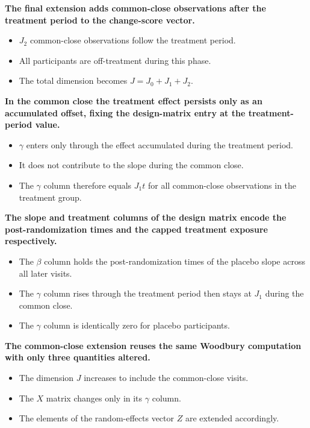 \documentclass[
  11pt,
]{article}
\begin{document}
\textbf{The final extension adds common-close observations after the treatment period to the change-score vector.}

\begin{itemize}\setlength{\itemsep}{2pt}\setlength{\parskip}{0pt}
\item $J_2$ common-close observations follow the treatment period.
\item All participants are off-treatment during this phase.
\item The total dimension becomes $J = J_0 + J_1 + J_2$.
\end{itemize}

\textbf{In the common close the treatment effect persists only as an accumulated offset, fixing the design-matrix entry at the treatment-period value.}

\begin{itemize}\setlength{\itemsep}{2pt}\setlength{\parskip}{0pt}
\item $\gamma$ enters only through the effect accumulated during the treatment period.
\item It does not contribute to the slope during the common close.
\item The $\gamma$ column therefore equals $J_1 t$ for all common-close observations in the treatment group.
\end{itemize}

\textbf{The slope and treatment columns of the design matrix encode the post-randomization times and the capped treatment exposure respectively.}

\begin{itemize}\setlength{\itemsep}{2pt}\setlength{\parskip}{0pt}
\item The $\beta$ column holds the post-randomization times of the placebo slope across all later visits.
\item The $\gamma$ column rises through the treatment period then stays at $J_1$ during the common close.
\item The $\gamma$ column is identically zero for placebo participants.
\end{itemize}

\textbf{The common-close extension reuses the same Woodbury computation with only three quantities altered.}

\begin{itemize}\setlength{\itemsep}{2pt}\setlength{\parskip}{0pt}
\item The dimension $J$ increases to include the common-close visits.
\item The $X$ matrix changes only in its $\gamma$ column.
\item The elements of the random-effects vector $Z$ are extended accordingly.
\end{itemize}
\end{document}
